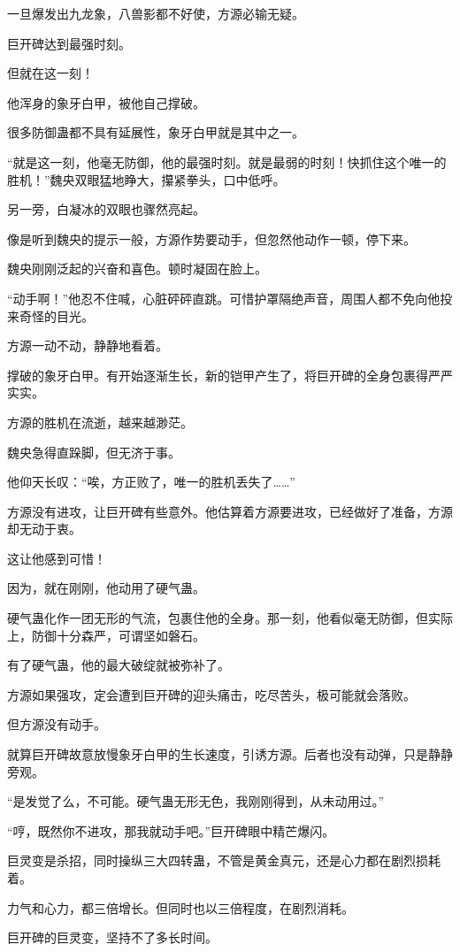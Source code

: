 \begin{this_body}
一旦爆发出九龙象，八兽影都不好使，方源必输无疑。

巨开碑达到最强时刻。

但就在这一刻！

他浑身的象牙白甲，被他自己撑破。

很多防御蛊都不具有延展性，象牙白甲就是其中之一。

“就是这一刻，他毫无防御，他的最强时刻。就是最弱的时刻！快抓住这个唯一的胜机！”魏央双眼猛地睁大，攥紧拳头，口中低呼。

另一旁，白凝冰的双眼也骤然亮起。

像是听到魏央的提示一般，方源作势要动手，但忽然他动作一顿，停下来。

魏央刚刚泛起的兴奋和喜色。顿时凝固在脸上。

“动手啊！”他忍不住喊，心脏砰砰直跳。可惜护罩隔绝声音，周围人都不免向他投来奇怪的目光。

方源一动不动，静静地看着。

撑破的象牙白甲。有开始逐渐生长，新的铠甲产生了，将巨开碑的全身包裹得严严实实。

方源的胜机在流逝，越来越渺茫。

魏央急得直跺脚，但无济于事。

他仰天长叹：“唉，方正败了，唯一的胜机丢失了……”

方源没有进攻，让巨开碑有些意外。他估算着方源要进攻，已经做好了准备，方源却无动于衷。

这让他感到可惜！

因为，就在刚刚，他动用了硬气蛊。

硬气蛊化作一团无形的气流，包裹住他的全身。那一刻，他看似毫无防御，但实际上，防御十分森严，可谓坚如磐石。

有了硬气蛊，他的最大破绽就被弥补了。

方源如果强攻，定会遭到巨开碑的迎头痛击，吃尽苦头，极可能就会落败。

但方源没有动手。

就算巨开碑故意放慢象牙白甲的生长速度，引诱方源。后者也没有动弹，只是静静旁观。

“是发觉了么，不可能。硬气蛊无形无色，我刚刚得到，从未动用过。”

“哼，既然你不进攻，那我就动手吧。”巨开碑眼中精芒爆闪。

巨灵变是杀招，同时操纵三大四转蛊，不管是黄金真元，还是心力都在剧烈损耗着。

力气和心力，都三倍增长。但同时也以三倍程度，在剧烈消耗。

巨开碑的巨灵变，坚持不了多长时间。


\end{this_body}
